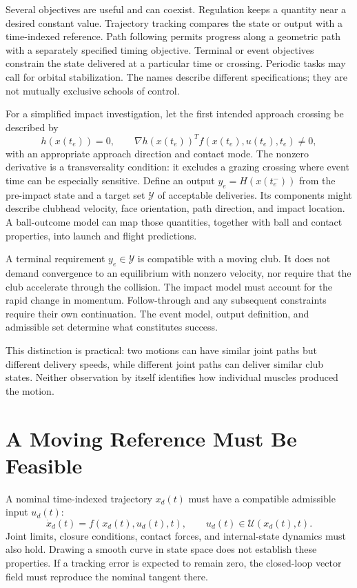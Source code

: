 \documentclass[12pt, openany]{book}
\theoremstyle{plain}
\begin{document}
Several objectives are useful and can coexist. Regulation keeps a quantity
near a desired constant value. Trajectory tracking compares the state or output
with a time-indexed reference. Path following permits progress along a geometric
path with a separately specified timing objective. Terminal or event objectives
constrain the state delivered at a particular time or crossing. Periodic tasks
may call for orbital stabilization. The names describe different specifications;
they are not mutually exclusive schools of control.

For a simplified impact investigation, let the first intended approach crossing
be described by
\begin{equation}
 h(x(t_e))=0,\qquad \nabla h(x(t_e))^Tf(x(t_e),u(t_e),t_e)\ne0,
 \label{eq:motion_impact_event}
\end{equation}
with an appropriate approach direction and contact mode. The nonzero derivative
is a transversality condition: it excludes a grazing crossing where event time
can be especially sensitive. Define an output $y_e=H(x(t_e^-))$ from the
pre-impact state and a target set $\mathcal Y$ of acceptable deliveries. Its
components might describe clubhead velocity, face orientation, path direction,
and impact location. A ball-outcome model can map those quantities, together
with ball and contact properties, into launch and flight predictions.

A terminal requirement $y_e\in\mathcal Y$ is compatible with a moving club.
It does not demand convergence to an equilibrium with nonzero velocity, nor
require that the club accelerate through the collision. The impact model must
account for the rapid change in momentum. Follow-through and any subsequent
constraints require their own continuation. The event model, output definition,
and admissible set determine what constitutes success.

This distinction is practical: two motions can have similar joint paths but
different delivery speeds, while different joint paths can deliver similar
club states. Neither observation by itself identifies how individual muscles
produced the motion.

\section{A Moving Reference Must Be Feasible}

A nominal time-indexed trajectory $x_d(t)$ must have a compatible admissible
input $u_d(t)$:
\begin{equation}
 \dot x_d(t)=f(x_d(t),u_d(t),t),\qquad u_d(t)\in\mathcal U(x_d(t),t).
 \label{eq:motion_nominal_feasibility}
\end{equation}
Joint limits, closure conditions, contact forces, and internal-state dynamics
must also hold. Drawing a smooth curve in state space does not establish these
properties. If a tracking error is expected to remain zero, the closed-loop
vector field must reproduce the nominal tangent there.
\end{document}
